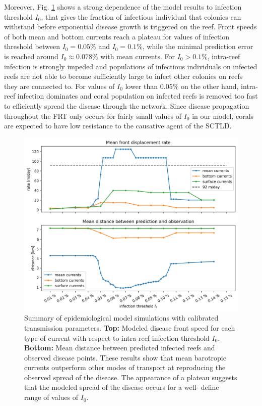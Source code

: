 \documentclass[utf8]{frontiersSCNS}
\begin{document}
Moreover, Fig. \ref{fig:results} shows a strong dependence of the model results to infection threshold $I_0$, that gives the fraction of infectious individual that colonies can withstand before exponential disease growth is triggered on the reef. Front speeds of both mean and bottom currents reach a plateau for values of infection threshold between $I_0=0.05\%$ and $I_0=0.1\%$, while the minimal prediction error is reached around $I_0 \approx 0.078\%$ with mean currents. For $I_0 > 0.1\%$, intra-reef infection is strongly impeded and populations of infectious individuals on infected reefs are not able to become sufficiently large to infect other colonies on reefs they are connected to. For values of $I_0$ lower than $0.05\%$ on the other hand, intra-reef infection dominates and coral population on infected reefs is removed too fast to efficiently spread the disease through the network. Since disease propagation throughout the FRT only occurs for fairly small values of $I_0$ in our model, corals are expected to have low resistance to the causative agent of the SCTLD. 

\begin{figure}
    \centering
    \includegraphics[width=.8\textwidth]{figures/sctld_validation_corrected.png}
    \caption{Summary of epidemiological model simulations with calibrated transmission parameters. \textbf{Top:} Modeled disease front speed for each type of current with respect to intra-reef infection threshold $I_0$. \textbf{Bottom:} Mean distance between predicted infected reefs and observed disease points. These results show that mean barotropic currents outperform other modes of transport at reproducing the observed spread of the disease. The appearance of a plateau suggests that the modeled spread of the disease occurs for a well- define range of values of $I_0$.}
    \label{fig:results}
\end{figure}
\end{document}
